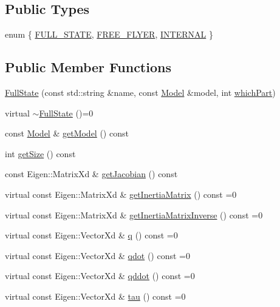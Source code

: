 \subsection*{Public Types}
\begin{DoxyCompactItemize}
\item 
enum \{ \hyperlink{classocra_1_1FullState_a8623fb06b8930505d950f7651e75b519af5d38d391c1a3c23006d51e6db4adea8}{F\+U\+L\+L\+\_\+\+S\+T\+A\+TE}, 
\hyperlink{classocra_1_1FullState_a8623fb06b8930505d950f7651e75b519a2b23349d3727ddf8b0d10a6c06dfcc31}{F\+R\+E\+E\+\_\+\+F\+L\+Y\+ER}, 
\hyperlink{classocra_1_1FullState_a8623fb06b8930505d950f7651e75b519a6c76abe0ec381b256a1e2429308126a5}{I\+N\+T\+E\+R\+N\+AL}
 \}
\end{DoxyCompactItemize}
\subsection*{Public Member Functions}
\begin{DoxyCompactItemize}
\item 
\hyperlink{classocra_1_1FullState_ae30ccfdd99c72531c1218b270d00c5df}{Full\+State} (const std\+::string \&name, const \hyperlink{classocra_1_1Model}{Model} \&model, int \hyperlink{classocra_1_1FullState_a489d85a3e8d2a88f31f0cac4e5f445bf}{which\+Part})
\item 
virtual \hyperlink{classocra_1_1FullState_a7392bab88e107fe2862c01eb9c9bc1a4}{$\sim$\+Full\+State} ()=0
\item 
const \hyperlink{classocra_1_1Model}{Model} \& \hyperlink{classocra_1_1FullState_a1aa8a23ddf856ffc8323e7793e65e964}{get\+Model} () const 
\item 
int \hyperlink{classocra_1_1FullState_afcbf8d374aad439812c610608689f07d}{get\+Size} () const 
\item 
const Eigen\+::\+Matrix\+Xd \& \hyperlink{classocra_1_1FullState_a31687405d6c1d295df4d23684c964ec6}{get\+Jacobian} () const 
\item 
virtual const Eigen\+::\+Matrix\+Xd \& \hyperlink{classocra_1_1FullState_a5d5c2ddfaf4868f78b4621d27b500784}{get\+Inertia\+Matrix} () const =0
\item 
virtual const Eigen\+::\+Matrix\+Xd \& \hyperlink{classocra_1_1FullState_a10f3a888554035bf13b3f636ce4b4edc}{get\+Inertia\+Matrix\+Inverse} () const =0
\item 
virtual const Eigen\+::\+Vector\+Xd \& \hyperlink{classocra_1_1FullState_a3bb03b513d7cb3a5447d1d4eb2d643b0}{q} () const =0
\item 
virtual const Eigen\+::\+Vector\+Xd \& \hyperlink{classocra_1_1FullState_a7018fe03dc3c8b3ec95d3c2015ae60e6}{qdot} () const =0
\item 
virtual const Eigen\+::\+Vector\+Xd \& \hyperlink{classocra_1_1FullState_a5882a53273cd9d3baae36b5850deadae}{qddot} () const =0
\item 
virtual const Eigen\+::\+Vector\+Xd \& \hyperlink{classocra_1_1FullState_a24723b4a382c2bf51e6c32cbd1bd7b06}{tau} () const =0
\end{DoxyCompactItemize}
